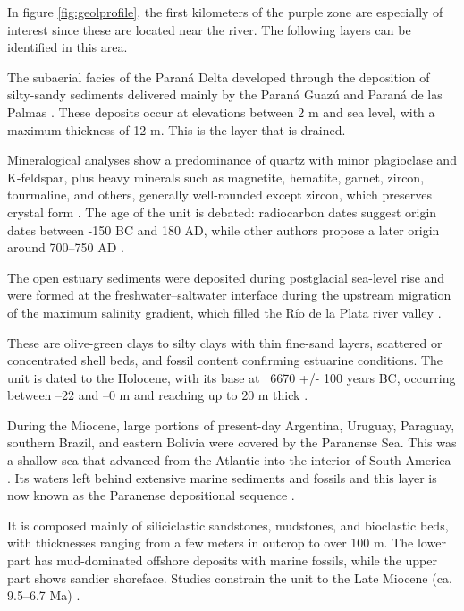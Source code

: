 In figure \ref{fig:geolprofile}, the first kilometers of the purple zone are especially of interest since these are located near the river. The following layers can be identified in this area.

The subaerial facies of the Paraná Delta developed through the deposition of silty-sandy sediments delivered mainly by the Paraná Guazú and Paraná de las Palmas \autocite{joseluiscavallottoEvolucionCambiosAmbientales2005}. These deposits occur at elevations between 2 m and sea level, with a maximum thickness of 12 m. This is the layer that is drained.

Mineralogical analyses show a predominance of quartz with minor plagioclase and K-feldspar, plus heavy minerals such as magnetite, hematite, garnet, zircon, tourmaline, and others, generally well-rounded except zircon, which preserves crystal form \autocite{rafaelcordiniContribucionConocimientoGeologia1949}. The age of the unit is debated: radiocarbon dates suggest origin dates between -150 BC and 180 AD, while other authors propose a later origin around 700–750 AD \autocite{joseluiscavallottoEvolucionCambiosAmbientales2005}.

The open estuary sediments were deposited during postglacial sea-level rise and were formed at the freshwater–saltwater interface during the upstream migration of the maximum salinity gradient, which filled the Río de la Plata river valley \autocite{joseluiscavallottoEvolucionCambiosAmbientales2005}.

These are olive-green clays to silty clays with thin fine-sand layers, scattered or concentrated shell beds, and fossil content confirming estuarine conditions. The unit is dated to the Holocene, with its base at ~6670 +/- 100 years BC, occurring between –22 and –0 m and reaching up to 20 m thick \autocite{vogelGroningenRadiocarbonDates1969}.

During the Miocene, large portions of present-day Argentina, Uruguay, Paraguay, southern Brazil, and eastern Bolivia were covered by the Paranense Sea. This was a shallow sea that advanced from the Atlantic into the interior of South America . Its waters left behind extensive marine sediments and fossils and this layer is now known as the Paranense depositional sequence \autocite{tineoReconstructingSouthAmerican2024}.

It is composed mainly of siliciclastic sandstones, mudstones, and bioclastic beds, with thicknesses ranging from a few meters in outcrop to over 100 m. The lower part has mud-dominated offshore deposits with marine fossils, while the upper part shows sandier shoreface. Studies constrain the unit to the Late Miocene (ca. 9.5–6.7 Ma) \autocite{tineoReconstructingSouthAmerican2024}.


